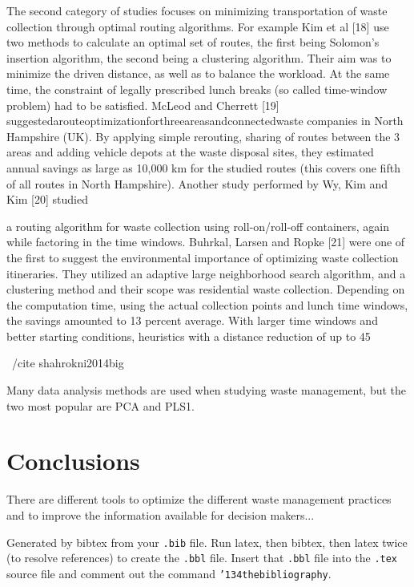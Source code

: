 \documentclass[sigconf]{acmart}
\begin{document}
The second category of studies focuses on minimizing transportation of waste collection through optimal routing algorithms. For example Kim et al [18] use two methods to calculate an optimal set of routes, the ﬁrst being Solomon’s insertion algorithm, the second being a clustering algorithm. Their aim was to minimize the driven distance, as well as to balance the workload. At the same time, the constraint of legally prescribed lunch breaks (so called time-window problem) had to be satisﬁed. McLeod and Cherrett [19] suggestedarouteoptimizationforthreeareasandconnectedwaste companies in North Hampshire (UK). By applying simple rerouting, sharing of routes between the 3 areas and adding vehicle depots at the waste disposal sites, they estimated annual savings as large as 10,000 km for the studied routes (this covers one ﬁfth of all routes in North Hampshire). Another study performed by Wy, Kim and Kim [20] studied

a routing algorithm for waste collection using roll-on/roll-off containers, again while factoring in the time windows. Buhrkal, Larsen and Ropke [21] were one of the ﬁrst to suggest the environmental importance of optimizing waste collection itineraries. They utilized an adaptive large neighborhood search algorithm, and a clustering method and their scope was residential waste collection. Depending on the computation time, using the actual collection points and lunch time windows, the savings amounted to 13 percent average. With larger time windows and better starting conditions, heuristics with a distance reduction of up to 45%

~/cite {shahrokni2014big}






Many data analysis methods are used when studying waste management, but the two most popular are PCA and PLS1. 
~\cite{bohm2013}




\section{Conclusions}

There are different tools to optimize the different waste management practices  and to improve the information available for decision makers...



\appendix


Generated by bibtex from your \texttt{.bib} file.  Run latex, then
bibtex, then latex twice (to resolve references) to create the
\texttt{.bbl} file.  Insert that \texttt{.bbl} file into the
\texttt{.tex} source file and comment out the command
\texttt{{\char'134}thebibliography}.
\end{document}
